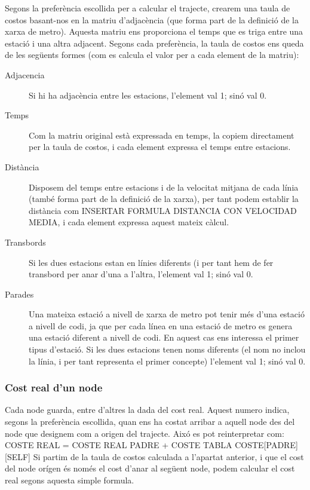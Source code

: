 \documentclass[a4paper,12pt]{article}
\begin{document}
                Segons la preferència escollida per a calcular el trajecte, crearem una taula de costos basant-nos en la matriu d’adjacència (que forma part de la definició de la xarxa de metro). Aquesta matriu ens proporciona el temps que es triga entre una estació i una altra adjacent.
                Segons cada preferència, la taula de costos ens queda de les següents formes (com es calcula el valor per a cada element de la matriu):
                \begin{description}
                    \item[Adjacencia] Si hi ha adjacència entre les estacions, l’element val 1; sinó val 0.
                    \item[Temps] Com la matriu original està expressada en temps, la copiem directament per la taula de costos, i cada element expressa el temps entre estacions.
                    \item[Distància] Disposem del temps entre estacions i de la velocitat mitjana de cada línia (també forma part de la definició de la xarxa), per tant podem establir la distància com INSERTAR FORMULA DISTANCIA CON VELOCIDAD MEDIA, i cada element expressa aquest mateix càlcul.
                    \item[Transbords] Si les dues estacions estan en línies diferents (i per tant hem de fer transbord per anar d’una a l’altra, l’element val 1; sinó val 0.
                    \item[Parades] Una mateixa estació a nivell de xarxa de metro pot tenir més d’una estació a nivell de codi, ja que per cada línea en una estació de metro es genera una estació diferent a nivell de codi. En aquest cas ens interessa el primer tipus d’estació. Si les dues estacions tenen noms diferents (el nom no inclou la línia, i per tant representa el primer concepte) l’element val 1; sinó val 0. 
                \end{description}
            
            \subsubsection*{Cost real d’un node}

                Cada node guarda, entre d’altres la dada del cost real. Aquest numero indica, segons la preferència escollida, quan ens ha costat arribar a aquell node des del node que designem com a origen del trajecte. Aixó es pot reinterpretar com: COSTE REAL = COSTE REAL PADRE + COSTE TABLA COSTE[PADRE][SELF]
                Si partim de la taula de costos calculada a l’apartat anterior, i que el cost del node orígen és només el cost d’anar al següent node, podem calcular el cost real segons aquesta simple formula.
    
\end{document}
